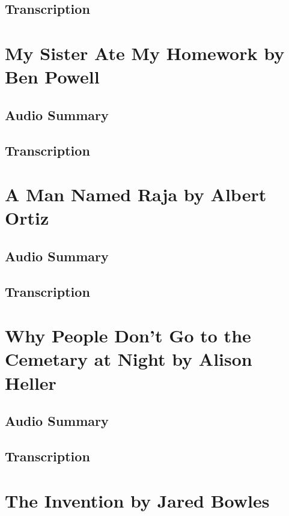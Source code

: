 \subsection{Transcription}

\section{My Sister Ate My Homework by Ben Powell}

\subsection{Audio Summary}

\subsection{Transcription}

\section{A Man Named Raja by Albert Ortiz}

\subsection{Audio Summary}

\subsection{Transcription}

\section{Why People Don't Go to the Cemetary at Night by Alison Heller}

\subsection{Audio Summary}

\subsection{Transcription}

\section{The Invention by Jared Bowles}

